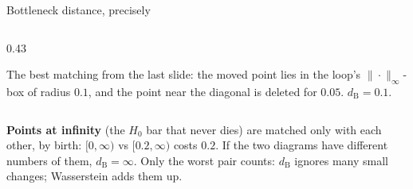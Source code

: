 \documentclass[10pt,aspectratio=169]{beamer}
\newcommand{\dB}{d_{\mathrm{B}}}
\begin{document}
\begin{frame}[shrink=5]{Bottleneck distance, precisely}
\begin{columns}[T,onlytextwidth]
\begin{column}{0.43\textwidth}
                \vspace{0.3em}
                \footnotesize\raggedright
                The best matching from the last slide: the moved point lies in the loop's
                $\|\cdot\|_\infty$-box of radius $0.1$, and the point near the diagonal is
                deleted for $0.05$. $\dB=0.1$.
            \end{column}
        \end{columns}
        \vspace{0.4em}
        \small
        \textbf{Points at infinity} (the $H_0$ bar that never dies) are matched only with
        each other, by birth: $[0,\infty)$ vs $[0.2,\infty)$ costs $0.2$. If the two
        diagrams have different numbers of them, $\dB=\infty$.
        \alert{Only the worst pair counts}: $\dB$ ignores many small changes; Wasserstein
        adds them up.
    \end{frame}
\end{document}
